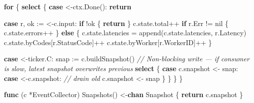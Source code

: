\documentclass[
]{article}
\newenvironment{Shaded}{}{}
\newcommand{\BuiltInTok}[1]{\textcolor[rgb]{0.00,0.50,0.00}{#1}}
\newcommand{\CommentTok}[1]{\textcolor[rgb]{0.38,0.63,0.69}{\textit{#1}}}
\newcommand{\ControlFlowTok}[1]{\textcolor[rgb]{0.00,0.44,0.13}{\textbf{#1}}}
\newcommand{\KeywordTok}[1]{\textcolor[rgb]{0.00,0.44,0.13}{\textbf{#1}}}
\newcommand{\NormalTok}[1]{#1}
\newcommand{\OperatorTok}[1]{\textcolor[rgb]{0.40,0.40,0.40}{#1}}
\newcommand{\OtherTok}[1]{\textcolor[rgb]{0.00,0.44,0.13}{#1}}
\begin{document}
\begin{Shaded}
\begin{Highlighting}[]
    \ControlFlowTok{for} \OperatorTok{\{}
        \ControlFlowTok{select} \OperatorTok{\{}
        \ControlFlowTok{case} \OperatorTok{\textless{}{-}}\NormalTok{ctx}\OperatorTok{.}\NormalTok{Done}\OperatorTok{():}
            \ControlFlowTok{return}

        \ControlFlowTok{case}\NormalTok{ r}\OperatorTok{,}\NormalTok{ ok }\OperatorTok{:=} \OperatorTok{\textless{}{-}}\NormalTok{c}\OperatorTok{.}\NormalTok{input}\OperatorTok{:}
            \ControlFlowTok{if} \OperatorTok{!}\NormalTok{ok }\OperatorTok{\{}
                \ControlFlowTok{return}
            \OperatorTok{\}}
\NormalTok{            c}\OperatorTok{.}\NormalTok{state}\OperatorTok{.}\NormalTok{total}\OperatorTok{++}
            \ControlFlowTok{if}\NormalTok{ r}\OperatorTok{.}\NormalTok{Err }\OperatorTok{!=} \OtherTok{nil} \OperatorTok{\{}
\NormalTok{                c}\OperatorTok{.}\NormalTok{state}\OperatorTok{.}\NormalTok{errors}\OperatorTok{++}
            \OperatorTok{\}} \ControlFlowTok{else} \OperatorTok{\{}
\NormalTok{                c}\OperatorTok{.}\NormalTok{state}\OperatorTok{.}\NormalTok{latencies }\OperatorTok{=} \BuiltInTok{append}\OperatorTok{(}\NormalTok{c}\OperatorTok{.}\NormalTok{state}\OperatorTok{.}\NormalTok{latencies}\OperatorTok{,}\NormalTok{ r}\OperatorTok{.}\NormalTok{Latency}\OperatorTok{)}
\NormalTok{                c}\OperatorTok{.}\NormalTok{state}\OperatorTok{.}\NormalTok{byCodes}\OperatorTok{[}\NormalTok{r}\OperatorTok{.}\NormalTok{StatusCode}\OperatorTok{]++}
\NormalTok{                c}\OperatorTok{.}\NormalTok{state}\OperatorTok{.}\NormalTok{byWorker}\OperatorTok{[}\NormalTok{r}\OperatorTok{.}\NormalTok{WorkerID}\OperatorTok{]++}
            \OperatorTok{\}}

        \ControlFlowTok{case} \OperatorTok{\textless{}{-}}\NormalTok{ticker}\OperatorTok{.}\NormalTok{C}\OperatorTok{:}
\NormalTok{            snap }\OperatorTok{:=}\NormalTok{ c}\OperatorTok{.}\NormalTok{buildSnapshot}\OperatorTok{()}
            \CommentTok{// Non{-}blocking write — if consumer is slow, latest snapshot overwrites previous}
            \ControlFlowTok{select} \OperatorTok{\{}
            \ControlFlowTok{case}\NormalTok{ c}\OperatorTok{.}\NormalTok{snapshot }\OperatorTok{\textless{}{-}}\NormalTok{ snap}\OperatorTok{:}
            \ControlFlowTok{case} \OperatorTok{\textless{}{-}}\NormalTok{c}\OperatorTok{.}\NormalTok{snapshot}\OperatorTok{:} \CommentTok{// drain old}
\NormalTok{                c}\OperatorTok{.}\NormalTok{snapshot }\OperatorTok{\textless{}{-}}\NormalTok{ snap}
            \OperatorTok{\}}
        \OperatorTok{\}}
    \OperatorTok{\}}
\OperatorTok{\}}

\KeywordTok{func} \OperatorTok{(}\NormalTok{c }\OperatorTok{*}\NormalTok{EventCollector}\OperatorTok{)}\NormalTok{ Snapshots}\OperatorTok{()} \OperatorTok{\textless{}{-}}\KeywordTok{chan}\NormalTok{ Snapshot }\OperatorTok{\{}
    \ControlFlowTok{return}\NormalTok{ c}\OperatorTok{.}\NormalTok{snapshot}
\OperatorTok{\}}
\end{Highlighting}
\end{Shaded}
\end{document}
